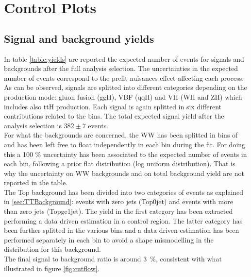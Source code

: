 \section{Control Plots}
\label{sec:ControlPlots}

\subsection{Signal and background yields}\label{subsec:yields}
In table \ref{table:yields} are reported the expected number of events for signals and backgrounds after the full analysis selection. The uncertainties in the expected number of events correspond to the prefit nuisances effect affecting each process. As can be observed, signals are splitted into different categories depending on the production mode: gluon fusion (ggH), VBF (qqH) and VH (WH and ZH) which includes also ttH production. Each signal is again splitted in six different contributions related to the \pth bins. The total expected signal yield after the analysis selection is $382 \pm 7$ events.\\
For what the backgrounds are concerned, the WW has been splitted in bins of \pth and has been left free to float independently in each bin during the fit. For doing this a 100 \% uncertainty has been associated to the expected number of events in each bin, following a prior flat distribution (log uniform distribution). That is why the uncertainty on WW backgrounds and on total background yield are not reported in the table.\\
The Top background has been divided into two categories of events as explained in \ref{sec:TTBackground}: events with zero jets (Top0jet) and events with more than zero jets (Topge1jet). The yield in the first category has been extracted performing a data driven estimation in a control region. The latter category has been further splitted in the various \pth bins and a data driven estimation has been performed separately in each bin to avoid a shape mismodelling in the \pth distribution for this background.\\
The final signal to background ratio is around 3~\%, consistent with what illustrated in figure \ref{fig:cutflow}.

